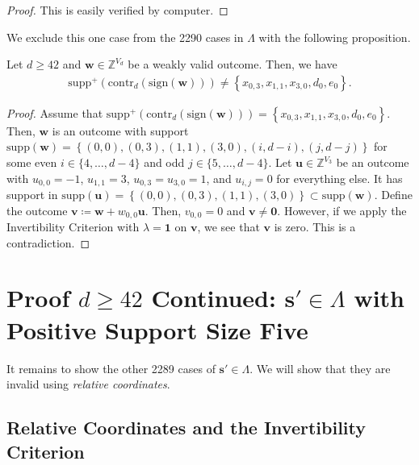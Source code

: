 \begin{proof}
    This is easily verified by computer.
\end{proof}

We exclude this one case from the 2290 cases in \( \Lambda \) with the following proposition.

\begin{proposition}
    Let \( d \geq 42 \) and \( \mathbf{w} \in \mathbb{Z}^{V_d} \) be a weakly valid outcome. Then, we have 
    \begin{align*}
        \mathrm{supp}^+(\mathrm{contr}_d(\mathrm{sign}(\mathbf{w}))) \neq \left\{ x_{0,3}, x_{1,1}, x_{3,0}, d_0, e_0 \right\}.
    \end{align*}
\end{proposition}

\begin{proof}
    Assume that \( \mathrm{supp}^+(\mathrm{contr}_d(\mathrm{sign}(\mathbf{w}))) = \left\{ x_{0,3}, x_{1,1}, x_{3,0}, d_0, e_0 \right\} \).
    Then, \( \mathbf{w} \) is an outcome with support \(  \mathrm{supp}(\mathbf{w}) = \left\{ (0,0), (0,3), (1,1), (3,0), (i,d-i), (j, d-j) \right\} \)
    for some even \( i \in \{ 4,\dots, d-4 \}\) and odd \( j \in \{5, \dots, d-4 \} \). Let \( \mathbf{u} \in \mathbb{Z}^{V_3} \) be an outcome with \( u_{0,0} = -1 \), \( u_{1,1} = 3 \), \( u_{0,3} = u_{3,0} = 1 \), and \( u_{i,j} = 0 \) for everything else. 
    It has support in \( \mathrm{supp}(\mathbf{u}) = \left\{ (0,0), (0,3), (1,1), (3,0) \right\}  \subset  \mathrm{supp}(\mathbf{w})\). Define the outcome \( \mathbf{v} \coloneqq \mathbf{w} +w_{0,0} \mathbf{u} \). Then, \( v_{0,0} = 0 \) and \( \mathbf{v} \neq \mathbf{0} \). However, if we apply the Invertibility Criterion with \( \lambda = \mathbf{1} \) on \( \mathbf{v} \), we see that \( \mathbf{v} \) is zero. This is a contradiction.
\end{proof}

\section{Proof \( d \geq 42\) Continued: \( \mathbf{s}' \in \Lambda\) with Positive Support Size Five}

It remains to show the other 2289 cases of \( \mathbf{s}' \in \Lambda \). We will show that they are invalid using \emph{relative coordinates}.

\subsection{Relative Coordinates and the Invertibility Criterion}

